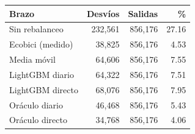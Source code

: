 \begin{tabular}{@{}lrrr@{}}
\toprule
Brazo & Desvíos & Salidas & \% \\
\midrule
Sin rebalanceo & 232,561 & 856,176 & 27.16 \\
Ecobici (medido) & 38,825 & 856,176 & 4.53 \\
Media móvil & 64,606 & 856,176 & 7.55 \\
LightGBM diario & 64,322 & 856,176 & 7.51 \\
LightGBM directo & 68,076 & 856,176 & 7.95 \\
Oráculo diario & 46,468 & 856,176 & 5.43 \\
Oráculo directo & 34,768 & 856,176 & 4.06 \\
\bottomrule
\end{tabular}
